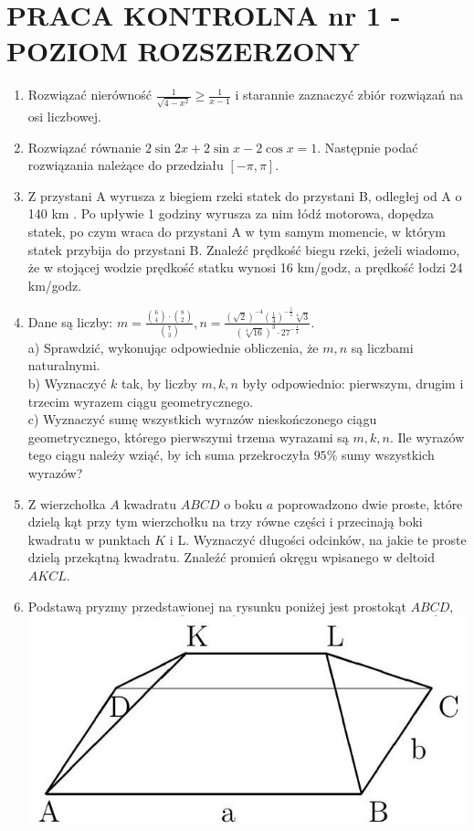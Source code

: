 \documentclass[10pt]{article}
\begin{document}
\section*{PRACA KONTROLNA nr 1 - POZIOM ROZSZERZONY}
\begin{enumerate}
  \item Rozwiązać nierówność $\frac{1}{\sqrt{4-x^{2}}} \geqslant \frac{1}{x-1}$ i starannie zaznaczyć zbiór rozwiązań na osi liczbowej.
  \item Rozwiązać równanie $2 \sin 2 x+2 \sin x-2 \cos x=1$. Następnie podać rozwiązania należące do przedziału $[-\pi, \pi]$.
  \item Z przystani A wyrusza z biegiem rzeki statek do przystani B, odległej od A o 140 km . Po upływie 1 godziny wyrusza za nim łódź motorowa, dopędza statek, po czym wraca do przystani A w tym samym momencie, w którym statek przybija do przystani B. Znaleźć prędkość biegu rzeki, jeżeli wiadomo, że w stojącej wodzie prędkość statku wynosi 16 km/godz, a prędkość łodzi 24 km/godz.
  \item Dane są liczby: $m=\frac{\binom{6}{4} \cdot\binom{8}{2}}{\binom{7}{3}}, n=\frac{(\sqrt{2})^{-4}\left(\frac{1}{4}\right)^{-\frac{5}{2}} \sqrt[4]{3}}{(\sqrt[4]{16})^{3} \cdot 27^{-\frac{1}{4}}}$.\\
a) Sprawdzić, wykonując odpowiednie obliczenia, że $m, n$ są liczbami naturalnymi.\\
b) Wyznaczyć $k$ tak, by liczby $m, k, n$ były odpowiednio: pierwszym, drugim i trzecim wyrazem ciągu geometrycznego.\\
c) Wyznaczyć sumę wszystkich wyrazów nieskończonego ciągu geometrycznego, którego pierwszymi trzema wyrazami są $m, k, n$. Ile wyrazów tego ciągu należy wziąć, by ich suma przekroczyła $95 \%$ sumy wszystkich wyrazów?
  \item Z wierzchołka $A$ kwadratu $A B C D$ o boku $a$ poprowadzono dwie proste, które dzielą kąt przy tym wierzchołku na trzy równe części i przecinają boki kwadratu w punktach $K$ i L. Wyznaczyć długości odcinków, na jakie te proste dzielą przekątną kwadratu. Znaleźć promień okręgu wpisanego w deltoid $A K C L$.
  \item Podstawą pryzmy przedstawionej na rysunku poniżej jest prostokąt $A B C D$,\\
\includegraphics[max width=\textwidth, center]{2024_11_16_55121a588b067d1ba139g-02}\\

\end{enumerate}
\end{document}
